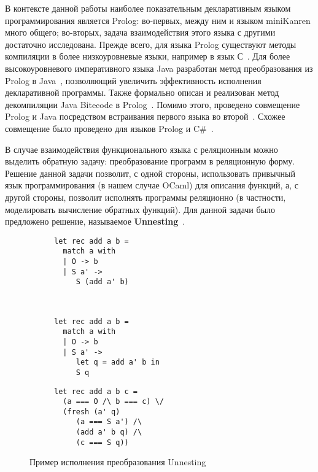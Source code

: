 В контексте данной работы наиболее показательным декларативным языком программирования является Prolog: во-первых, между ним и языком miniKanren много общего; во-вторых, задача взаимодействия этого языка с другими достаточно исследована. Прежде всего, для языка Prolog существуют методы компиляции в более низкоуровневые языки, например в язык С~\cite{RW:C1,RW:C2}. Для более высокоуровневого императивного языка Java разработан метод преобразования из Prolog в Java~\cite{RW:Prolog2Java}, позволяющий увеличить эффективность исполнения декларативной программы. Также формально описан и реализован метод декомпиляции Java Bitecode в Prolog~\cite{RW:Java2Prolog}. Помимо этого, проведено совмещение Prolog и Java посредством встраивания первого языка во второй~\cite{RW:PrologAndJava}. Схожее совмещение было проведено для языков Prolog и C\#~\cite{RW:PrologAndCSharp}.

В случае взаимодействия функционального языка с реляционным можно выделить обратную задачу: преобразование программ в реляционную форму. Решение данной задачи позволит, с одной стороны, использовать привычный язык программирования (в нашем случае OCaml) для описания функций, а, с другой стороны, позволит исполнять программы реляционно (в частности, моделировать вычисление обратных функций). Для данной задачи было предложено решение, называемое \textbf{Unnesting}~\cite{lozov-spbu:miniKanren}.

\begin{figure}[h]
  \centering
  \begin{subfigure}[t]{0.4\textwidth}
    \centering
\begin{lstlisting}
let rec add a b =
  match a with
  | O -> b
  | S a' ->
     S (add a' b)
\end{lstlisting}
\caption{}
  \end{subfigure}
  ~
  \begin{subfigure}[t]{0.4\textwidth}
        \centering
\begin{lstlisting}
let rec add a b =
  match a with
  | O -> b
  | S a' ->
     let q = add a' b in
     S q
\end{lstlisting}
\vspace{-1\baselineskip}
\caption{}
  \end{subfigure}
  \vskip2mm
  \begin{subfigure}[t]{0.4\textwidth}
        \centering
\begin{lstlisting}
let rec add a b c =
  (a === O /\ b === c) \/
  (fresh (a' q)
     (a === S a') /\
     (add a' b q) /\
     (c === S q))
\end{lstlisting}
\caption{}
  \end{subfigure}
\caption{Пример исполнения преобразования Unnesting}
\label{unnesting_example}
\end{figure}


